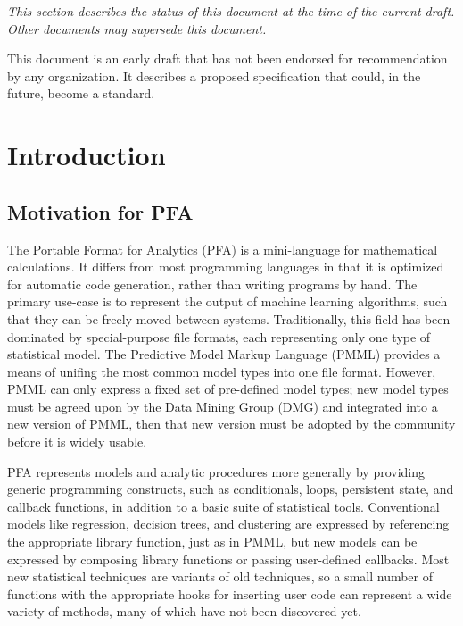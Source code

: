 \documentclass{article}
\theoremstyle{definition}
\begin{document}
{\it This section describes the status of this document at the time of the current draft.  Other documents may supersede this document.}

This document is an early draft that has not been endorsed for recommendation by any organization.  It describes a proposed specification that could, in the future, become a standard.

\pagebreak

\tableofcontents

\pagebreak

\section{Introduction}

\subsection{Motivation for PFA}

The Portable Format for Analytics (PFA) is a mini-language for mathematical calculations.  It differs from most programming languages in that it is optimized for automatic code generation, rather than writing programs by hand.  The primary use-case is to represent the output of machine learning algorithms, such that they can be freely moved between systems.  Traditionally, this field has been dominated by special-purpose file formats, each representing only one type of statistical model.  The Predictive Model Markup Language (PMML) provides a means of unifing the most common model types into one file format.  However, PMML can only express a fixed set of pre-defined model types; new model types must be agreed upon by the Data Mining Group (DMG) and integrated into a new version of PMML, then that new version must be adopted by the community before it is widely usable.

PFA represents models and analytic procedures more generally by providing generic programming constructs, such as conditionals, loops, persistent state, and callback functions, in addition to a basic suite of statistical tools.  Conventional models like regression, decision trees, and clustering are expressed by referencing the appropriate library function, just as in PMML, but new models can be expressed by composing library functions or passing user-defined callbacks.  Most new statistical techniques are variants of old techniques, so a small number of functions with the appropriate hooks for inserting user code can represent a wide variety of methods, many of which have not been discovered yet.
\end{document}
